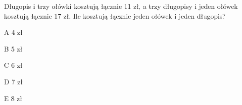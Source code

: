\begin{tresc}
Długopis i trzy ołówki kosztują łącznie 11 zł, a trzy długopisy i jeden ołówek kosztują łącznie 17 zł. Ile kosztują łącznie jeden ołówek i jeden długopis?
\end{tresc}
\begin{wariant}{A} 4 zł \end{wariant}
\begin{wariant}{B} 5 zł \end{wariant}
\begin{wariant}{C} 6 zł \end{wariant}
\begin{wariant}{D} 7 zł \end{wariant}
\begin{wariant}{E} 8 zł \end{wariant}

